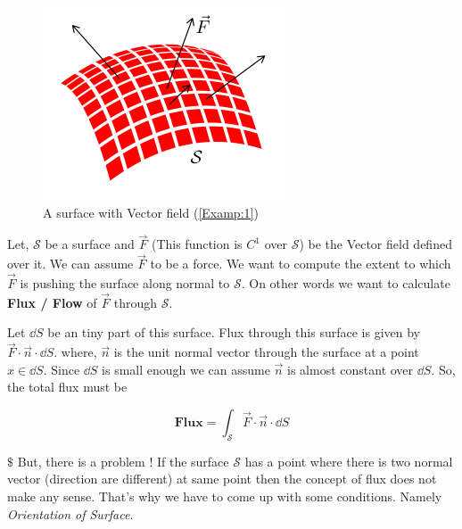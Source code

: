 \documentclass[Analysis-3]{subfiles}
\begin{document}
\begin{tcolorbox} \label{Examp:1}
     
    \begin{figure}
        \centering
        \includegraphics[width=.78\linewidth]{figures/lec-26.3.png}
        \caption{A surface with Vector field (\ref{Examp:1})}
    \end{figure}
    
    Let, $\mathcal{S}$ be a surface and $\vec{F}$ (This function is $C^1$ over $\mathcal{S}$) be the Vector field defined over it. We can assume $\vec{F}$ to be a force. We want to compute the extent to which $\vec{F}$ is pushing the surface along normal to $\mathcal{S}$. On other words we want to calculate \textbf{Flux / Flow} of $\vec{F}$ through $\mathcal{S}$. 

    \vspace{0.2cm}

    Let $\dd S$ be an tiny part of  this surface. Flux through this surface is given by $\vec{F}\cdot\vec{n} \cdot \dd S$. where, $\vec{n}$ is the unit normal vector through the surface at a point $x \in \dd S$. Since $\dd S$ is small enough we can assume $\vec{n}$ is almost constant over $\dd S$. So, the total flux must be 

    \[ \textbf{Flux} = \int_{\mathcal{S}} \vec{F}\cdot\vec{n} \cdot \dd S \]

    $\$$ But, there is a problem ! If the surface $\mathcal{S}$ has a point where there is two normal vector (direction are different) at same point then the concept of flux does not make any sense. That's why we have to come up with some conditions. Namely \textit{Orientation of Surface}.

\end{tcolorbox}
\end{document}
